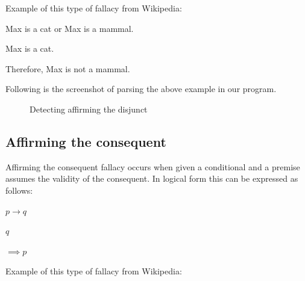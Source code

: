 \documentclass[14pt, english]{article}
\begin{document}
Example of this type of fallacy from Wikipedia: 

\begin{center}
Max is a cat or Max is a mammal.
\par\end{center}

\begin{center}
Max is a cat.
\par\end{center}

\begin{center}
Therefore, Max is not a mammal.
\par\end{center}

Following is the screenshot of parsing the above example in our program.

\begin{figure}[htp]
 \caption{Detecting affirming the disjunct} \end{figure}


\subsection{Affirming the consequent}

Affirming the consequent fallacy occurs when given a conditional and
a premise assumes the validity of the consequent. In logical form
this can be expressed as follows:

\begin{center}
$p\to q$
\par\end{center}

\begin{center}
$q$
\par\end{center}

\begin{center}
$\implies p$
\par\end{center}

Example of this type of fallacy from Wikipedia: 
\end{document}

